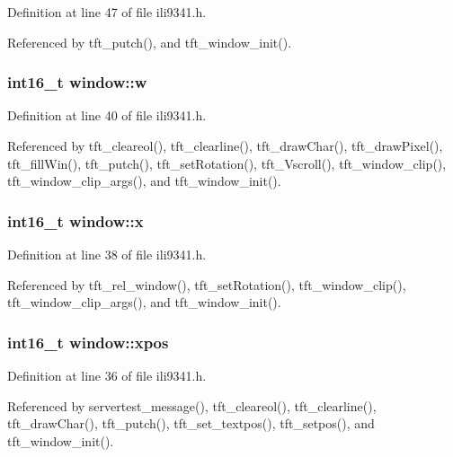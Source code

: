 Definition at line 47 of file ili9341.\-h.



Referenced by tft\-\_\-putch(), and tft\-\_\-window\-\_\-init().

\hypertarget{structwindow_ad89fdeb11ce94e2e7501f7290372d6ae}{
\subsubsection[{w}]{\setlength{\rightskip}{0pt plus 5cm}int16\-\_\-t window\-::w}}\label{structwindow_ad89fdeb11ce94e2e7501f7290372d6ae}


Definition at line 40 of file ili9341.\-h.



Referenced by tft\-\_\-cleareol(), tft\-\_\-clearline(), tft\-\_\-draw\-Char(), tft\-\_\-draw\-Pixel(), tft\-\_\-fill\-Win(), tft\-\_\-putch(), tft\-\_\-set\-Rotation(), tft\-\_\-\-Vscroll(), tft\-\_\-window\-\_\-clip(), tft\-\_\-window\-\_\-clip\-\_\-args(), and tft\-\_\-window\-\_\-init().

\hypertarget{structwindow_a879b99940dfc34772f0257f54c67b817}{
\subsubsection[{x}]{\setlength{\rightskip}{0pt plus 5cm}int16\-\_\-t window\-::x}}\label{structwindow_a879b99940dfc34772f0257f54c67b817}


Definition at line 38 of file ili9341.\-h.



Referenced by tft\-\_\-rel\-\_\-window(), tft\-\_\-set\-Rotation(), tft\-\_\-window\-\_\-clip(), tft\-\_\-window\-\_\-clip\-\_\-args(), and tft\-\_\-window\-\_\-init().

\hypertarget{structwindow_a890a7dba31e7328500f4e5e41e51aab7}{
\subsubsection[{xpos}]{\setlength{\rightskip}{0pt plus 5cm}int16\-\_\-t window\-::xpos}}\label{structwindow_a890a7dba31e7328500f4e5e41e51aab7}


Definition at line 36 of file ili9341.\-h.



Referenced by servertest\-\_\-message(), tft\-\_\-cleareol(), tft\-\_\-clearline(), tft\-\_\-draw\-Char(), tft\-\_\-putch(), tft\-\_\-set\-\_\-textpos(), tft\-\_\-setpos(), and tft\-\_\-window\-\_\-init().

